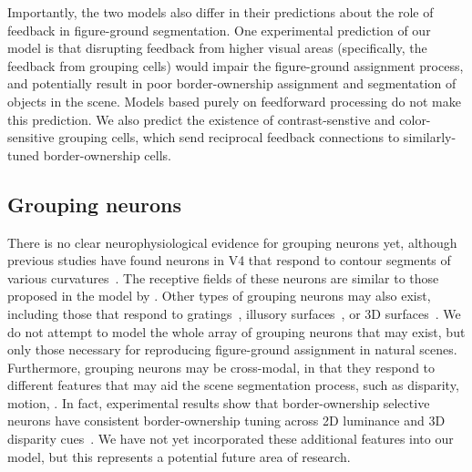 Importantly, the two models also differ in their predictions about the role of feedback in figure-ground segmentation. One experimental prediction of our model is that disrupting feedback from higher visual areas (specifically, the feedback from grouping cells) would impair the figure-ground assignment process, and potentially result in poor border-ownership assignment and segmentation of objects in the scene. Models based purely on feedforward processing do not make this prediction. We also predict the existence of contrast-senstive and color-sensitive grouping cells, which send reciprocal feedback connections to similarly-tuned border-ownership cells.

\subsection{Grouping neurons}
There is no clear neurophysiological evidence for
grouping neurons yet,
although previous studies have found neurons in V4 
that respond to contour segments
of various curvatures~\citep{Pasupathy_Connor02,Brincat_Connor04}. The receptive fields of these neurons are
similar to those proposed in the model by
\cite{Craft_etal07}. Other types of grouping neurons may also exist,
including those that respond to 
gratings~\citep{Hegde_vanEssen07}, illusory
surfaces~\citep{Cox_etal13}, or 3D
surfaces~\citep{He_Nakayama95,Hu_etal15a}.
We do not attempt to model the whole array of grouping neurons that may exist, but
only those necessary for reproducing figure-ground assignment in natural scenes. Furthermore, grouping neurons may be cross-modal, in that they respond to different features that may aid the scene segmentation process, such as disparity, motion, \etc. In fact, experimental results show that border-ownership selective neurons have consistent border-ownership tuning across 2D luminance and 3D disparity cues~\citep{Qiu_etal05}. We have not yet incorporated these additional features into our model, but this represents a potential future area of research.

